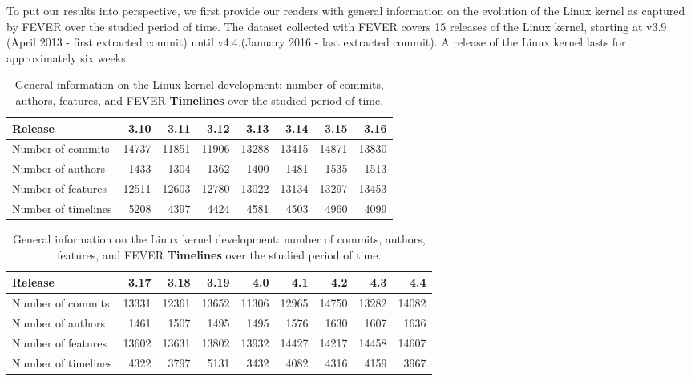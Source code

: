 To put our results into perspective, we first provide our readers with
general information on the evolution of the Linux kernel as captured by FEVER over the studied
period of time.
The dataset collected with FEVER covers 15 releases of the Linux kernel, starting at v3.9 (April 2013 - first extracted commit) until v4.4.(January 2016 - last extracted commit).
A release of the Linux kernel lasts for approximately six weeks.


\begin{table}[h]

\centering
\begin{adjustbox}{width=\textwidth}
\begin{tabular}{|l|r|r|r|r|r|r|r|}
\hline
Release & 3.10 & 3.11 & 3.12 & 3.13 & 3.14 & 3.15 & 3.16 \\
\hline
Number of commits	& 14737 & 11851 & 11906	& 13288	& 13415	& 14871	& 13830	\\
Number of authors	& 1433	& 1304  & 1362  	& 1400	& 1481	&1535	& 1513	\\
Number of features	& 12511	& 12603	& 12780	& 13022	& 13134	& 13297	& 13453	\\
Number of timelines	& 5208	& 4397	& 4424	& 4581	& 4503	& 4960	&4099	\\
\hline
\end{tabular}
\end{adjustbox}

\vspace{5mm}
\begin{adjustbox}{width=\textwidth}
\begin{tabular}{|l|r|r|r|r|r|r|r|r|}
\hline
Release &  3.17 & 3.18 & 3.19 & 4.0 & 4.1 & 4.2 & 4.3 & 4.4 \\
\hline
Number of commits	& 13331	& 12361	&13652	&11306	&12965	&14750	&13282	&14082	\\
Number of authors	& 1461	& 1507 	& 1495	&1495 	&1576	&1630	&1607	&1636 	\\
Number of features	& 13602	& 13631	&13802	&13932	&14427	&14217	&14458	&14607	\\
Number of timelines	&4322	&3797	& 5131	& 3432 	& 4082	& 4316	&4159	&3967	\\
\hline
\end{tabular}
\end{adjustbox}

\caption{General information on the Linux kernel development: number of commits, authors, features, and FEVER \textbf{Timelines} over the studied period of time.}
\label{tab:general_info}
\end{table}


